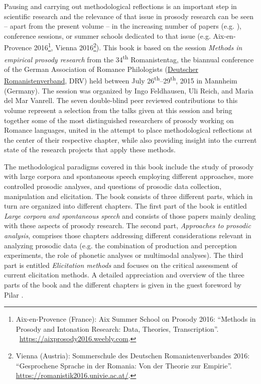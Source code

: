 \documentclass[output=paper]{langsci/langscibook}
\begin{document}
Pausing and carrying out methodological reflections is an important step in scientific research and the relevance of that issue in prosody research can be seen – apart from the present volume – in the increasing number of papers (e.g. \citealt{Niebuhr2015,Cole.2016}), conference sessions, or summer schools dedicated to that issue (e.g. Aix-en-Provence 2016\footnote{ Aix-en-Provence (France): Aix Summer School on Prosody 2016: “Methods in Prosody and Intonation Research: Data, Theories, Transcription”. ~\href{https://aixprosody2016.weebly.com}{https://aixprosody2016.weebly.com}.}, Vienna 2016\footnote{Vienna (Austria): Sommerschule des Deutschen Romanistenverbandes 2016: “Gesprochene Sprache in der Romania: Von der Theorie zur Empirie”. \href{https://romanistik2016.univie.ac.at/}{https://romanistik2016.univie.ac.at/}.}). This book is based on the session \textit{Methods in empirical prosody research} from the 34\textsuperscript{th} Romanistentag, the biannual conference of the German Association of Romance Philologists (\href{http://www.deutscher-romanistenverband.de/}{Deutscher Romanistenverband}, DRV) held between July 26\textsuperscript{th}--29\textsuperscript{th}, 2015 in Mannheim (Germany). The session was organized by Ingo Feldhausen, Uli Reich, and Maria del Mar Vanrell. The seven double-blind peer reviewed contributions to this volume represent a selection from the talks given at this session and bring together some of the most distinguished researchers of prosody working on Romance languages, united in the attempt to place methodological reflections at the center of their respective chapter, while also providing insight into the current state of the research projects that apply these methods.\largerpage

The methodological paradigms covered in this book include the study of pro\-sody with large corpora and spontaneous speech employing different approaches, more controlled prosodic analyses, and questions of prosodic data collection, manipulation and elicitation. The book consists of three different parts, which in turn are organized into different chapters. The first part of the book is entitled \textit{Large corpora and spontaneous speech} and consists of those papers mainly dealing with these aspects of prosody research. The second part, \textit{Approaches to prosodic analysis}, comprises those chapters addressing different considerations relevant in analyzing prosodic data (e.g. the combination of production and perception experiments, the role of phonetic analyses or multimodal analyses). The third part is entitled \textit{Elicitation methods} and focuses on the critical assessment of current elicitation methods. A detailed appreciation and overview of the three parts of the book and the different chapters is given in the guest foreword by Pilar \citeauthor{Prieto.2018}. \largerpage
\end{document}
